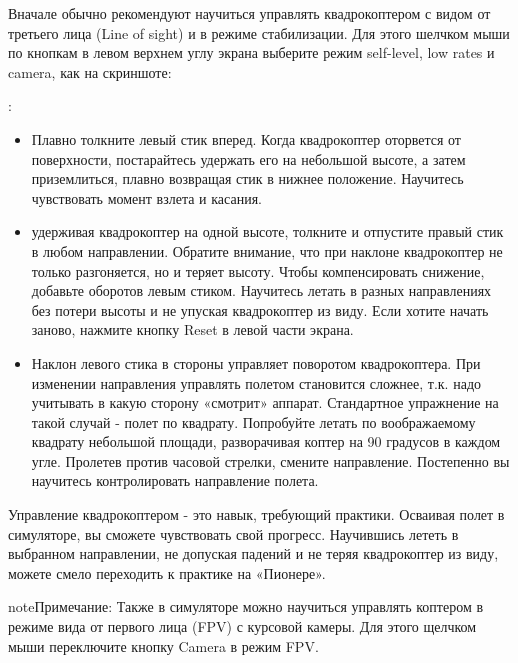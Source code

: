 \documentclass[a4paper,10pt,russian]{sphinxmanual}
\begin{document}
Вначале обычно рекомендуют научиться управлять квадрокоптером с видом от третьего лица (Line of sight) и в режиме стабилизации. Для этого шелчком мыши по кнопкам в левом верхнем углу экрана выберите режим self-level, low rates и camera, как на скриншоте:

\noindent{}

:
\begin{itemize}
\item {} 
Плавно толкните левый стик вперед. Когда квадрокоптер оторвется от поверхности, постарайтесь удержать его на небольшой высоте, а затем приземлиться, плавно возвращая стик в нижнее положение. Научитесь чувствовать момент взлета и касания.

\item {} 
удерживая квадрокоптер на одной высоте, толкните и отпустите правый стик в любом направлении. Обратите внимание, что при наклоне квадрокоптер не только разгоняется, но и теряет высоту. Чтобы компенсировать снижение, добавьте оборотов левым стиком. Научитесь летать в разных направлениях без потери высоты и не упуская квадрокоптер из виду. Если хотите начать заново, нажмите кнопку Reset в левой части экрана.

\item {} 
Наклон левого стика в стороны управляет поворотом квадрокоптера. При изменении направления управлять полетом становится сложнее, т.к. надо учитывать в какую сторону «смотрит» аппарат. Стандартное упражнение на такой случай - полет по квадрату. Попробуйте летать по воображаемому квадрату небольшой площади, разворачивая коптер на 90 градусов в каждом угле. Пролетев против часовой стрелки, смените направление. Постепенно вы научитесь контролировать направление полета.

\end{itemize}

Управление квадрокоптером - это навык, требующий практики. Осваивая полет в симуляторе, вы сможете чувствовать свой прогресс. Научившись лететь в выбранном направлении, не допуская падений и не теряя квадрокоптер из виду, можете смело переходить к практике на «Пионере».

\begin{sphinxadmonition}{note}{Примечание:}
Также в симуляторе можно научиться управлять коптером в режиме вида от первого лица (FPV) с курсовой камеры. Для этого щелчком мыши переключите кнопку Camera в режим FPV.
\end{sphinxadmonition}
\end{document}
